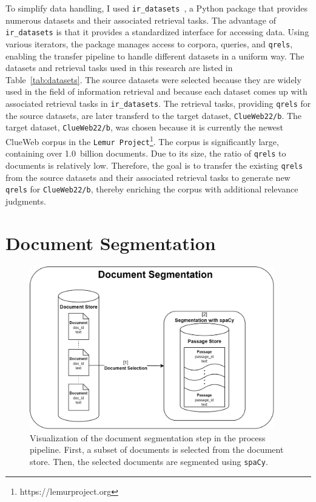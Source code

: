 To simplify data handling, I used \texttt{ir\_datasets}~\citep{macavaney:2021}, a Python package that provides numerous datasets and their associated retrieval tasks. The advantage of \texttt{ir\_datasets} is that it provides a standardized interface for accessing data. Using various iterators, the package manages access to corpora, queries, and \texttt{qrels}, enabling the transfer pipeline to handle different datasets in a uniform way. The datasets and retrieval tasks used in this research are listed in Table~\ref{tab:datasets}. The source datasets were selected because they are widely used in the field of information retrieval and because each dataset comes up with associated retrieval tasks in \texttt{ir\_datasets}. The retrieval tasks, providing \texttt{qrels} for the source datasets, are later transferd to the target dataset, \texttt{ClueWeb22/b}. The target dataset, \texttt{ClueWeb22/b}, was chosen because it is currently the newest ClueWeb corpus in the \texttt{Lemur Project}\footnote{https://lemurproject.org}. The corpus is significantly large, containing over 1.0~billion documents. Due to its size, the ratio of \texttt{qrels} to documents is relatively low. Therefore, the goal is to transfer the existing \texttt{qrels} from the source datasets and their associated retrieval tasks to generate new \texttt{qrels} for \texttt{ClueWeb22/b}, thereby enriching the corpus with additional relevance judgments. 


\section{Document Segmentation}\label{document-segmentation}

\begin{figure}[ht]
    \centering
    \includegraphics[width=0.95\textwidth]{./graphics/drawio/document_segmentation.png}
    \caption{Visualization of the document segmentation step in the process pipeline. First, a subset of documents is selected from the document store. Then, the selected documents are segmented using \texttt{spaCy}.}
    \label{fig:document-segmentation}
\end{figure}

